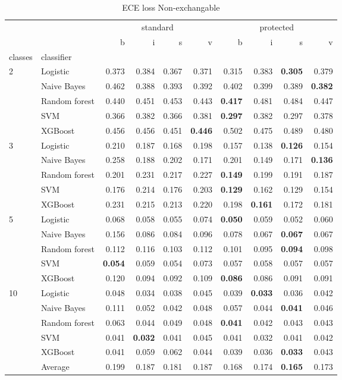\begin{table}
\caption{ECE loss Non-exchangable}
\begin{tabular}{l|l|rrrr|rrrr}
\toprule
 &  & \multicolumn{4}{c}{standard} & \multicolumn{4}{c}{protected} \\
 &  & b & i & s & v & b & i & s & v \\
classes & classifier &  &  &  &  &  &  &  &  \\
\midrule
\midrule
\multirow[c]{5}{*}{2} & Logistic & 0.373 & 0.384 & 0.367 & 0.371 & 0.315 & 0.383 & \textbf{0.305} & 0.379 \\
 & Naive Bayes & 0.462 & 0.388 & 0.393 & 0.392 & 0.402 & 0.399 & 0.389 & \textbf{0.382} \\
 & Random forest & 0.440 & 0.451 & 0.453 & 0.443 & \textbf{0.417} & 0.481 & 0.484 & 0.447 \\
 & SVM & 0.366 & 0.382 & 0.366 & 0.381 & \textbf{0.297} & 0.382 & 0.297 & 0.378 \\
 & XGBoost & 0.456 & 0.456 & 0.451 & \textbf{0.446} & 0.502 & 0.475 & 0.489 & 0.480 \\
\midrule
\multirow[c]{5}{*}{3} & Logistic & 0.210 & 0.187 & 0.168 & 0.198 & 0.157 & 0.138 & \textbf{0.126} & 0.154 \\
 & Naive Bayes & 0.258 & 0.188 & 0.202 & 0.171 & 0.201 & 0.149 & 0.171 & \textbf{0.136} \\
 & Random forest & 0.201 & 0.231 & 0.217 & 0.227 & \textbf{0.149} & 0.199 & 0.191 & 0.187 \\
 & SVM & 0.176 & 0.214 & 0.176 & 0.203 & \textbf{0.129} & 0.162 & 0.129 & 0.154 \\
 & XGBoost & 0.231 & 0.215 & 0.213 & 0.220 & 0.198 & \textbf{0.161} & 0.172 & 0.181 \\
\midrule
\multirow[c]{5}{*}{5} & Logistic & 0.068 & 0.058 & 0.055 & 0.074 & \textbf{0.050} & 0.059 & 0.052 & 0.060 \\
 & Naive Bayes & 0.156 & 0.086 & 0.084 & 0.096 & 0.078 & 0.067 & \textbf{0.067} & 0.067 \\
 & Random forest & 0.112 & 0.116 & 0.103 & 0.112 & 0.101 & 0.095 & \textbf{0.094} & 0.098 \\
 & SVM & \textbf{0.054} & 0.059 & 0.054 & 0.073 & 0.057 & 0.058 & 0.057 & 0.057 \\
 & XGBoost & 0.120 & 0.094 & 0.092 & 0.109 & \textbf{0.086} & 0.086 & 0.091 & 0.091 \\
\midrule
\multirow[c]{5}{*}{10} & Logistic & 0.048 & 0.034 & 0.038 & 0.045 & 0.039 & \textbf{0.033} & 0.036 & 0.042 \\
 & Naive Bayes & 0.111 & 0.052 & 0.042 & 0.048 & 0.057 & 0.044 & \textbf{0.041} & 0.046 \\
 & Random forest & 0.063 & 0.044 & 0.049 & 0.048 & \textbf{0.041} & 0.042 & 0.043 & 0.043 \\
 & SVM & 0.041 & \textbf{0.032} & 0.041 & 0.045 & 0.041 & 0.032 & 0.041 & 0.042 \\
 & XGBoost & 0.041 & 0.059 & 0.062 & 0.044 & 0.039 & 0.036 & \textbf{0.033} & 0.043 \\\midrule\ & Average & 0.199 & 0.187 & 0.181 & 0.187 & 0.168 & 0.174 & \textbf{0.165} & 0.173 \\
\bottomrule
\end{tabular}
\end{table}
